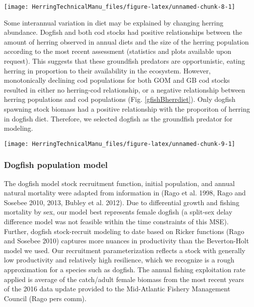 \documentclass[]{article}
\let\origfigure\figure
\let\endorigfigure\endfigure
\renewenvironment{figure}[1][2] {
    \expandafter\origfigure\expandafter[H]
} {
    \endorigfigure
}
\begin{document}
\begin{figure}

{\centering \texttt{[image: HerringTechnicalManu\_files/figure-latex/unnamed-chunk-8-1]} 

}

\caption{Annual diet compositions for major groundfish predators of herring estimated from NEFSC food habits database \label{gfishdiets}}\label{fig:unnamed-chunk-8}
\end{figure}

Some interannual variation in diet may be explained by changing herring
abundance. Dogfish and both cod stocks had positive relationships
between the amount of herring observed in annual diets and the size of
the herring population according to the most recent assessment
(statistics and plots available upon request). This suggests that these
groundfish predators are opportunistic, eating herring in proportion to
their availability in the ecosystem. However, monotonically declining
cod populations for both GOM and GB cod stocks resulted in either no
herring-cod relationship, or a negative relationship between herring
populations and cod populations (Fig. \ref{gfishBherrdiet}). Only
dogfish spawning stock biomass had a positive relationship with the
proporiton of herring in dogfish diet. Therefore, we selected dogfish as
the groundfish predator for modeling.

\begin{figure}

{\centering \texttt{[image: HerringTechnicalManu\_files/figure-latex/unnamed-chunk-9-1]} 

}

\caption{Relationship of assessed groundfish spawning stock biomass (SSB) with the proportion of herring in diet \label{gfishBherrdiet}}\label{fig:unnamed-chunk-9}
\end{figure}

\subsubsection{Dogfish population model}\label{dogfish-population-model}

The dogfish model stock recruitment function, initial population, and
annual natural mortality were adapted from information in (Rago et al.
1998, Rago and Sosebee 2010, 2013, Bubley et al. 2012). Due to
differential growth and fishing mortality by sex, our model best
represents female dogfish (a split-sex delay difference model was not
feasible within the time constraints of this MSE). Further, dogfish
stock-recruit modeling to date based on Ricker functions (Rago and
Sosebee 2010) captures more nuances in productivity than the
Beverton-Holt model we used. Our recruitment parameterization reflects a
stock with generally low productivity and relatively high resilience,
which we recognize is a rough approximation for a species such as
dogfish. The annual fishing exploitation rate applied is average of the
catch/adult female biomass from the most recent years of the 2016 data
update provided to the Mid-Atlantic Fishery Management Council (Rago
pers comm).
\end{document}

